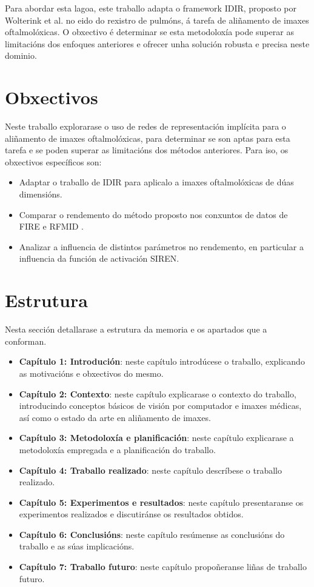 Para abordar esta lagoa, este traballo adapta o framework IDIR, proposto por Wolterink et al. \cite{wolterink2021implicit} no eido do rexistro de pulmóns, á tarefa de aliñamento de imaxes oftalmolóxicas. O obxectivo é determinar se esta metodoloxía pode superar as limitacións dos enfoques anteriores e ofrecer unha solución robusta e precisa neste dominio.

\section{Obxectivos}
\label{sec:obxectivos}

Neste traballo explorarase o uso de redes de representación implícita para o aliñamento de imaxes oftalmolóxicas, para determinar se son aptas para esta tarefa e se poden superar as limitacións dos métodos anteriores.
Para iso, os obxectivos específicos son:
\begin{itemize}
    \item Adaptar o traballo de IDIR \cite{wolterink2021implicit} para aplicalo a imaxes oftalmolóxicas de dúas dimensións.
    \item Comparar o rendemento do método proposto nos conxuntos de datos de FIRE \cite{FIRE} e RFMID \cite{RFMiD}.
    \item Analizar a influencia de distintos parámetros no rendemento, en particular a influencia da función de activación SIREN.
\end{itemize}

\section{Estrutura }
\label{sec:estrutura}

Nesta sección detallarase a estrutura da memoria e os apartados que a conforman.

\begin{itemize}
    \item \textbf{Capítulo 1: Introdución}: neste capítulo introdúcese o traballo, explicando as motivacións e obxectivos do mesmo.
    \item \textbf{Capítulo 2: Contexto}: neste capítulo explicarase o contexto do traballo, introducindo conceptos básicos de visión por computador e imaxes médicas, así como o estado da arte en aliñamento de imaxes.
    \item \textbf{Capítulo 3: Metodoloxía e planificación}: neste capítulo explicarase a metodoloxía empregada e a planificación do traballo.
    \item \textbf{Capítulo 4: Traballo realizado}: neste capítulo descríbese o traballo realizado.
    \item \textbf{Capítulo 5: Experimentos e resultados}: neste capítulo presentaranse os experimentos realizados e discutiránse os resultados obtidos. 
    \item \textbf{Capítulo 6: Conclusións}: neste capítulo resúmense as conclusións do traballo e as súas implicacións.
    \item \textbf{Capítulo 7: Traballo futuro}: neste capítulo propoñeranse liñas de traballo futuro.
\end{itemize}
